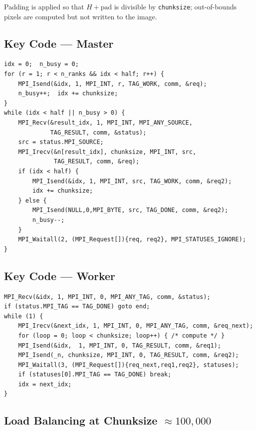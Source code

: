 \documentclass[11pt,a4paper]{article}
\begin{document}
Padding is applied so that $H + \text{pad}$ is divisible by
\texttt{chunksize}; out-of-bounds pixels are computed but not written to the
image.

\subsection{Key Code --- Master}
\begin{lstlisting}
idx = 0;  n_busy = 0;
for (r = 1; r < n_ranks && idx < half; r++) {
    MPI_Isend(&idx, 1, MPI_INT, r, TAG_WORK, comm, &req);
    n_busy++;  idx += chunksize;
}
while (idx < half || n_busy > 0) {
    MPI_Recv(&result_idx, 1, MPI_INT, MPI_ANY_SOURCE,
             TAG_RESULT, comm, &status);
    src = status.MPI_SOURCE;
    MPI_Irecv(&n[result_idx], chunksize, MPI_INT, src,
              TAG_RESULT, comm, &req);
    if (idx < half) {
        MPI_Isend(&idx, 1, MPI_INT, src, TAG_WORK, comm, &req2);
        idx += chunksize;
    } else {
        MPI_Isend(NULL,0,MPI_BYTE, src, TAG_DONE, comm, &req2);
        n_busy--;
    }
    MPI_Waitall(2, (MPI_Request[]){req, req2}, MPI_STATUSES_IGNORE);
}
\end{lstlisting}

\vfill
\subsection{Key Code --- Worker}
\begin{lstlisting}
MPI_Recv(&idx, 1, MPI_INT, 0, MPI_ANY_TAG, comm, &status);
if (status.MPI_TAG == TAG_DONE) goto end;
while (1) {
    MPI_Irecv(&next_idx, 1, MPI_INT, 0, MPI_ANY_TAG, comm, &req_next);
    for (loop = 0; loop < chunksize; loop++) { /* compute */ }
    MPI_Isend(&idx,  1, MPI_INT, 0, TAG_RESULT, comm, &req1);
    MPI_Isend(_n, chunksize, MPI_INT, 0, TAG_RESULT, comm, &req2);
    MPI_Waitall(3, (MPI_Request[]){req_next,req1,req2}, statuses);
    if (statuses[0].MPI_TAG == TAG_DONE) break;
    idx = next_idx;
}
\end{lstlisting}

\subsection{Load Balancing at Chunksize $\approx 100{,}000$}
\end{document}
